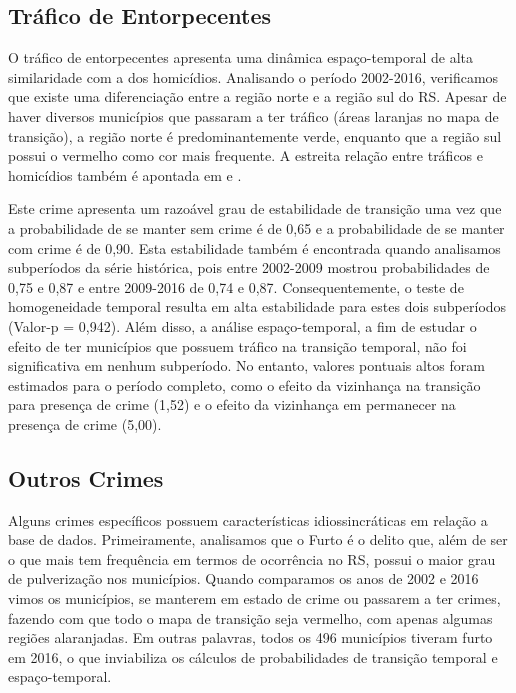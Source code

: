 \documentclass[12pt,openright,oneside,a4paper,english,french,spanish]{abntex2}
\numberwithin{table}{section} %
\numberwithin{figure}{section} %
\newcommand{\co}{\citeonline}
\begin{document}
\subsection{Tráfico de Entorpecentes\label{sec:trafico_acoplamento}}

O tráfico de entorpecentes apresenta uma dinâmica espaço-temporal de alta similaridade com a dos homicídios. Analisando o período 2002-2016, verificamos que existe uma diferenciação entre a região norte e a região sul do RS. Apesar de haver diversos municípios que passaram a ter tráfico (áreas laranjas no mapa de transição), a região norte é predominantemente verde, enquanto que a região sul possui o vermelho como cor mais frequente. A estreita relação entre tráficos e homicídios também é apontada em \co{beato2001conglomerados} e \co{menezes2017relaccoes}.

Este crime apresenta um razoável grau de estabilidade de transição uma vez que a probabilidade de se manter sem crime é de 0,65 e a probabilidade de se manter com crime é de 0,90. Esta estabilidade também é encontrada quando analisamos subperíodos da série histórica, pois entre 2002-2009 mostrou probabilidades de 0,75 e 0,87 e entre 2009-2016 de 0,74 e 0,87. Consequentemente, o teste de homogeneidade temporal resulta em alta estabilidade para estes dois subperíodos (Valor-p = 0,942).  Além disso, a análise espaço-temporal, a fim de estudar o efeito de ter municípios que possuem tráfico na transição temporal, não foi significativa em nenhum subperíodo. No entanto, valores pontuais altos foram estimados para o período completo, como o efeito da vizinhança na transição para presença de crime (1,52) e o efeito da vizinhança em permanecer na presença de crime (5,00).


\subsection{Outros Crimes\label{sec:outros_crimes_acoplamento}}

Alguns crimes específicos possuem características idiossincráticas em relação a base de dados. Primeiramente, analisamos que o Furto é o delito que, além de ser o que mais tem frequência em termos de ocorrência no RS, possui o maior grau de pulverização nos municípios. Quando comparamos os anos de 2002 e 2016 vimos os municípios, se manterem em estado de crime ou passarem a ter crimes, fazendo com que todo o mapa de transição seja vermelho, com apenas algumas regiões alaranjadas. Em outras palavras, todos os 496 municípios tiveram furto em 2016, o que inviabiliza os cálculos de probabilidades de transição temporal e espaço-temporal.
\end{document}
